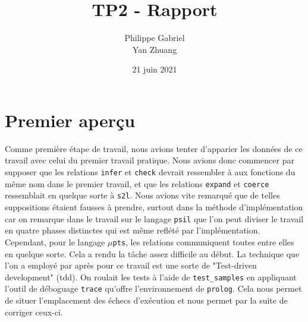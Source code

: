 \documentclass[12pt, titlepage]{article}
\begin{document}
\title{{\Huge \textbf{TP2 - Rapport}}}
\author{Philippe Gabriel \\ Yan Zhuang}
\date{21 juin 2021}

\maketitle

\setcounter{page}{2}

\newpage

\section{Premier aperçu}
Comme première étape de travail, nous avions tenter d'apparier les données de
ce travail avec celui du premier travail pratique. Nous avions donc commencer
par supposer que les relations \texttt{infer} et \texttt{check} devrait
ressembler à aux fonctions du même nom dans le premier travail, et que les
relations \texttt{expand} et \texttt{coerce} ressemblait en quelque sorte à
\texttt{s2l}. Nous avions vite remarqué que de telles suppositions étaient
fausses à prendre, surtout dans la méthode d'implémentation car on remarque
dans le travail sur le langage \texttt{psil} que l'on peut diviser le travail
en quatre phases distinctes qui est même reflété par l'implémentation.
Cependant, pour le langage $\mu$\texttt{pts}, les relations communiquent toutes
entre elles en quelque sorte. Cela a rendu la tâche assez difficile au début.
La technique que l'on a employé par après pour ce travail est une sorte de
"Test-driven development" (tdd). On roulait les tests à l'aide de
\texttt{test\_samples} en appliquant l'outil de déboguage \texttt{trace}
qu'offre l'environnement de \texttt{prolog}. Cela nous permet de situer
l'emplacement des échecs d'exécution et nous permet par la suite de
corriger ceux-ci.
\end{document}
